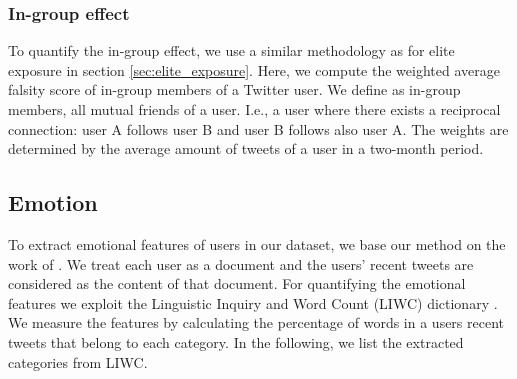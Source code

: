 \documentclass[
10pt, %
a4paper, %
oneside, %
headinclude,footinclude, %
] {book}%
\begin{document}
\subsubsection{In-group effect}


To quantify the in-group effect, we use a similar methodology as for elite exposure in section \ref{sec:elite_exposure}. Here, we compute the weighted average falsity score of in-group members of a Twitter user. We define as in-group members, all mutual friends of a user. I.e., a user where there exists a reciprocal connection: user A follows user B and user B follows also user A. The weights are determined by the average amount of tweets of a user in a two-month period. 




\subsection{Emotion} \label{sec:emotion_quantification}





To extract emotional features of users in our dataset, we base our method on the work of \cite{karami2021profiling}. We treat each user as a document and the users' recent tweets are considered as the content of that document. For quantifying the emotional features we exploit the Linguistic Inquiry and Word Count (LIWC) dictionary \citep{tausczik2010psychological}. We measure the features by calculating the percentage of words in a users recent tweets that belong to each category. In the following, we list the extracted categories from LIWC.
\end{document}
